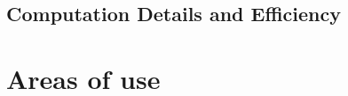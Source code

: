 \documentclass[handout]{beamer}
\begin{document}



\subsection{Computation Details and Efficiency}

%
%
%	 
%
%
%
%
\section{Areas of use}
\end{document}
